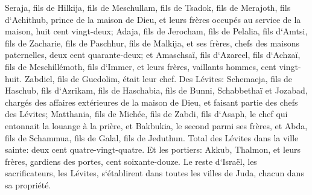 \verse Seraja, fils de Hilkija, fils de Meschullam, fils de Tsadok, fils de Merajoth, fils d`Achithub, prince de la maison de Dieu, 
\verse et leurs frères occupés au service de la maison, huit cent vingt-deux; Adaja, fils de Jerocham, fils de Pelalia, fils d`Amtsi, fils de Zacharie, fils de Paschhur, fils de Malkija, 
\verse et ses frères, chefs des maisons paternelles, deux cent quarante-deux; et Amaschsaï, fils d`Azareel, fils d`Achzaï, fils de Meschillémoth, fils d`Immer, 
\verse et leurs frères, vaillants hommes, cent vingt-huit. Zabdiel, fils de Guedolim, était leur chef. 
\verse Des Lévites: Schemaeja, fils de Haschub, fils d`Azrikam, fils de Haschabia, fils de Bunni, 
\verse Schabbethaï et Jozabad, chargés des affaires extérieures de la maison de Dieu, et faisant partie des chefs des Lévites; 
\verse Matthania, fils de Michée, fils de Zabdi, fils d`Asaph, le chef qui entonnait la louange à la prière, et Bakbukia, le second parmi ses frères, et Abda, fils de Schammua, fils de Galal, fils de Jeduthun. 
\verse Total des Lévites dans la ville sainte: deux cent quatre-vingt-quatre. 
\verse Et les portiers: Akkub, Thalmon, et leurs frères, gardiens des portes, cent soixante-douze. 
\verse Le reste d`Israël, les sacrificateurs, les Lévites, s`établirent dans toutes les villes de Juda, chacun dans sa propriété. 
